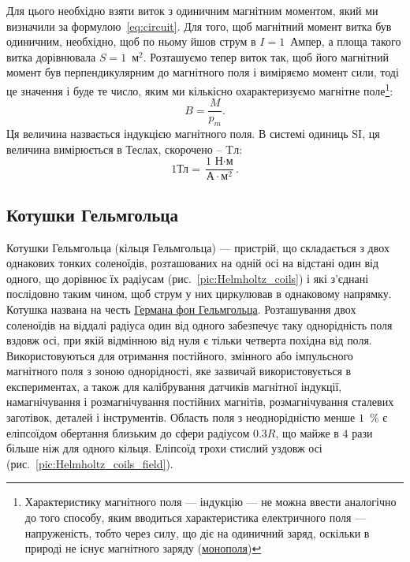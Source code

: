 Для цього необхідно взяти виток з одиничним магнітним моментом, який ми визначили за формулою~\eqref{eq:circuit}. Для  того, щоб магнітний момент витка був одиничним, необхідно, щоб по ньому йшов струм в $I = 1$~Ампер, а площа такого витка дорівнювала $S = 1$~м$^2$. Розташуємо тепер виток так, щоб його магнітний момент був перпендикулярним до магнітного поля і виміряємо момент сили, тоді це значення і буде те число, яким ми кількісно охарактеризуємо магнітне поле\footnote{Характеристику магнітного поля --- індукцію --- не можна ввести аналогічно до того способу, яким вводиться характеристика електричного поля --- напруженість, тобто через силу, що діє на одиничний заряд, оскільки в природі не існує магнітного заряду (\href{https://en.wikipedia.org/wiki/Magnetic_monopole}{монополя}) }:
\begin{equation}\label{B}
	B = \frac{M}{p_m}.
\end{equation}
Ця величина назвається індукцією магнітного поля. В системі одиниць SI, ця величина вимірюється в Теслах, скорочено -- Tл:
\begin{equation}
	1 \text{Тл} = \frac{\text{1 Н}\cdot\text{м}}{\text{А}\cdot\text{м}^2}.
\end{equation}


\subsection{Котушки Гельмгольца}

Котушки Гельмгольца (кільця Гельмгольца) --- пристрій, що складається з двох однакових тонких соленоїдів, розташованих на одній осі на відстані один від одного, що дорівнює їх радіусам (рис.~\ref{pic:Helmholtz_coils}) і які з'єднані послідовно таким чином, щоб струм у них циркулював в однаковому напрямку. Котушка названа на честь \href{https://en.wikipedia.org/wiki/Hermann_von_Helmholtz}{Германа фон Гельмгольца}. Розташування двох соленоїдів на віддалі радіуса один від одного забезпечує таку однорідність поля вздовж осі, при якій відмінною від нуля є тільки четверта похідна від поля. Використовуються для отримання постійного, змінного або імпульсного магнітного поля з зоною однорідності, яке зазвичай використовується в експериментах, а також для калібрування датчиків магнітної індукції, намагнічування і розмагнічування постійних магнітів, розмагнічування сталевих заготівок, деталей і інструментів. Область поля з неоднорідністю менше $1$~\% є еліпсоїдом обертання близьким до сфери радіусом $0.3R$, що майже в $4$ рази більше ніж для одного кільця. Еліпсоїд трохи стислий уздовж осі (рис.~\ref{pic:Helmholtz_coils_field}).


